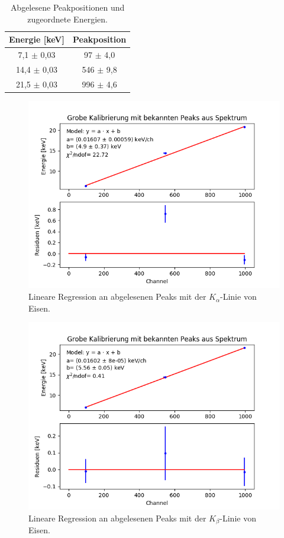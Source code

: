 \documentclass[12pt,a4paper]{article}
\begin{document}
\begin{table}
\centering
\begin{tabular}{|c|c|}
\hline 
Energie [keV] & Peakposition \\ 
\hline 
7,1 $\pm$ 0,03 & 97 $\pm$ 4,0 \\
\hline 
14,4 $\pm$ 0,03 & 546 $\pm$ 9,8 \\
\hline
21,5 $\pm$ 0,03 & 996 $\pm$ 4,6 \\
\hline
\end{tabular} 
\caption{Abgelesene Peakpositionen und zugeordnete Energien.}
\label{tab:Quellspektrum_PeakpositionenAlpha}
\end{table}

\begin{figure}
\centering
\includegraphics[scale=0.8]{Bilder/Quellspektrum/Kalibrierung_alpha.png}
\caption{Lineare Regression an abgelesenen Peaks mit der $K_{\alpha}$-Linie von Eisen.}
\label{fig:Quellspektrum_linRegAlpha}
\end{figure}

\begin{figure}
\centering
\includegraphics[scale=0.8]{Bilder/Quellspektrum/Kalibrierung_beta.png}
\caption{Lineare Regression an abgelesenen Peaks mit der $K_{\beta}$-Linie von Eisen.}
\label{fig:Quellspektrum_linRegBeta}
\end{figure}
\end{document}
